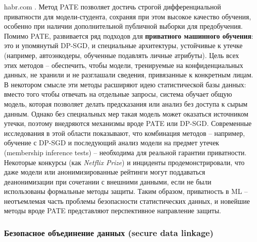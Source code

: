 habr.com
. Метод PATE позволяет достичь строгой дифференциальной приватности для модели-студента, сохраняя при этом высокое качество обучения, особенно при наличии дополнительной публичной выборки для предобучения. Помимо PATE, развивается ряд подходов для \textbf{приватного машинного обучения}: это и упомянутый DP-SGD, и специальные архитектуры, устойчивые к утечке (например, автоэнкодеры, обученные подавлять личные атрибуты). Цель всех этих методов – обеспечить, чтобы модели, тренируемые на конфиденциальных данных, не хранили и не разглашали сведения, привязанные к конкретным лицам. В некотором смысле эти методы расширяют идею статистической базы данных: вместо того чтобы отвечать на отдельные запросы, система обучает общую модель, которая позволяет делать предсказания или анализ без доступа к сырым данным. Однако без специальных мер такая модель может оказаться источником утечки, поэтому внедряются механизмы вроде PATE или DP-SGD. Современные исследования в этой области показывают, что комбинация методов – например, обучение с DP-SGD и последующий анализ модели на предмет утечек (membership inference tests) – необходима для реальной гарантии приватности. Некоторые конкурсы (как \textit{Netflix Prize}) и инциденты продемонстрировали, что даже модели или анонимизированные рейтинги могут поддаваться деанонимизации при сочетании с внешними данными, если не были использованы формальные методы защиты. Таким образом, приватность в ML – неотъемлемая часть проблемы безопасности статистических данных, и новейшие методы вроде PATE представляют перспективное направление защиты. \subsubsection{Безопасное объединение данных (secure data linkage)}

